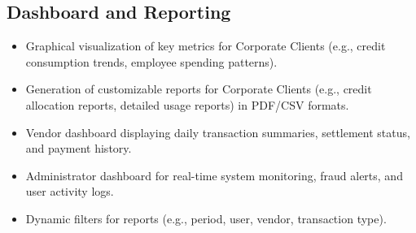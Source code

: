 \subsection{Dashboard and Reporting}
\begin{itemize}
    \item Graphical visualization of key metrics for Corporate Clients (e.g., credit consumption trends, employee spending patterns).
    \item Generation of customizable reports for Corporate Clients (e.g., credit allocation reports, detailed usage reports) in PDF/CSV formats.
    \item Vendor dashboard displaying daily transaction summaries, settlement status, and payment history.
    \item Administrator dashboard for real-time system monitoring, fraud alerts, and user activity logs.
    \item Dynamic filters for reports (e.g., period, user, vendor, transaction type).
\end{itemize}